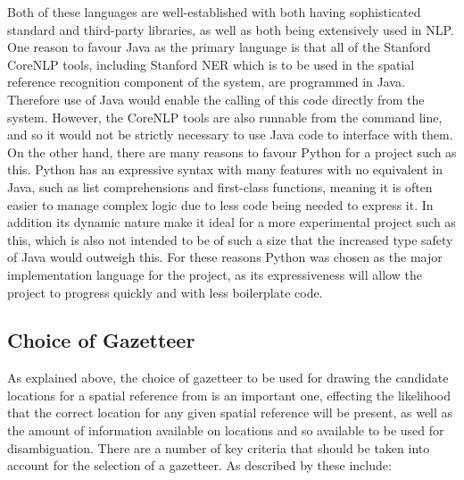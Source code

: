 \documentclass[12pt, a4paper]{report}
\begin{document}
Both of these languages are well-established with both having sophisticated standard and third-party libraries, as well as both being extensively used in NLP. One reason to favour Java as the primary language is that all of the Stanford CoreNLP tools, including Stanford NER which is to be used in the spatial reference recognition component of the system, are programmed in Java. Therefore use of Java would enable the calling of this code directly from the system. However, the CoreNLP tools are also runnable from the command line, and so it would not be strictly necessary to use Java code to interface with them. On the other hand, there are many reasons to favour Python for a project such as this. Python has an expressive syntax with many features with no equivalent in Java, such as list comprehensions and first-class functions, meaning it is often easier to manage complex logic due to less code being needed to express it. In addition its dynamic nature make it ideal for a more experimental project such as this, which is also not intended to be of such a size that the increased type safety of Java would outweigh this. For these reasons Python was chosen as the major implementation language for the project, as its expressiveness will allow the project to progress quickly and with less boilerplate code. 

\subsection{Choice of Gazetteer}
\label{subsec_gazetteer}

As explained above, the choice of gazetteer to be used for drawing the candidate locations for a spatial reference from is an important one, effecting the likelihood that the correct location for any given spatial reference will be present, as well as the amount of information available on locations and so available to be used for disambiguation. There are a number of key criteria that should be taken into account for the selection of a gazetteer. As described by \citet{leidner2004} these include:

\end{document}
